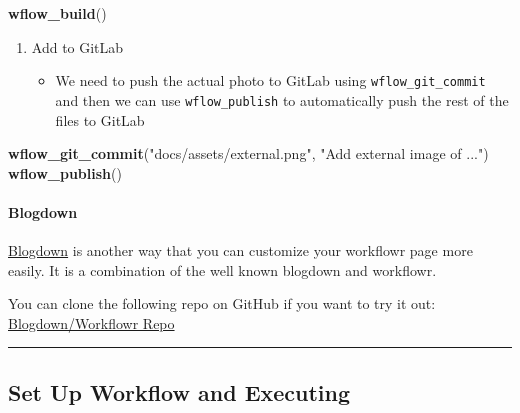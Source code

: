 \documentclass[openany]{article}
\newenvironment{Shaded}{\begin{snugshade}}{\end{snugshade}}
\newcommand{\KeywordTok}[1]{\textcolor[rgb]{0.13,0.29,0.53}{\textbf{#1}}}
\newcommand{\NormalTok}[1]{#1}
\newcommand{\StringTok}[1]{\textcolor[rgb]{0.31,0.60,0.02}{#1}}
\providecommand{\tightlist}{%
  \setlength{\itemsep}{0pt}\setlength{\parskip}{0pt}}
\let\oldparagraph\paragraph
\renewcommand{\paragraph}[1]{\oldparagraph{#1}\mbox{}}
\begin{document}
\begin{Shaded}
\begin{Highlighting}[]
\KeywordTok{wflow_build}\NormalTok{()}
\end{Highlighting}
\end{Shaded}

\begin{enumerate}
\def\labelenumi{\arabic{enumi}.}
\setcounter{enumi}{3}
\tightlist
\item
  Add to GitLab

  \begin{itemize}
  \tightlist
  \item
    We need to push the actual photo to GitLab using \texttt{wflow\_git\_commit} and then we can use \texttt{wflow\_publish} to automatically push the rest of the files to GitLab
  \end{itemize}
\end{enumerate}

\begin{Shaded}
\begin{Highlighting}[]
\KeywordTok{wflow_git_commit}\NormalTok{(}\StringTok{"docs/assets/external.png"}\NormalTok{, }\StringTok{"Add external image of ..."}\NormalTok{)}
\KeywordTok{wflow_publish}\NormalTok{()}
\end{Highlighting}
\end{Shaded}

\hypertarget{blogdown}{%
\paragraph{Blogdown}\label{blogdown}}

\href{https://bookdown.org/yihui/blogdown/a-quick-example.html}{Blogdown} is another way that you can customize your workflowr page more easily. It is a combination of the well known blogdown and workflowr.

You can clone the following repo on GitHub if you want to try it out: \href{https://github.com/docmanny/workflowr-blogdown-experiment}{Blogdown/Workflowr Repo}

\begin{center}\rule{0.5\linewidth}{\linethickness}\end{center}

\hypertarget{set-up-workflow-and-executing}{%
\subsection{Set Up Workflow and Executing}\label{set-up-workflow-and-executing}}
\end{document}
